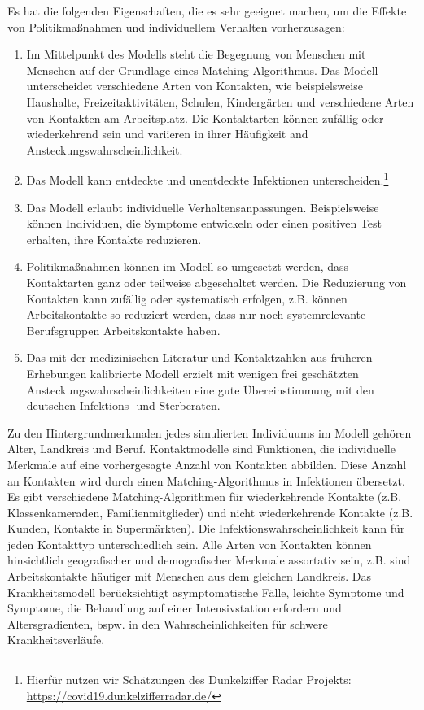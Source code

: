 \documentclass[a4paper,11pt,leqno,fleqn]{article}
\begin{document}
Es hat die folgenden Eigenschaften, die es sehr geeignet machen, um die Effekte von Politikmaßnahmen und individuellem Verhalten vorherzusagen:

\begin{enumerate}
    \item Im  Mittelpunkt des Modells steht die Begegnung von Menschen mit Menschen auf der Grundlage eines Matching-Algorithmus. Das Modell unterscheidet verschiedene Arten von Kontakten, wie beispielsweise Haushalte, Freizeitaktivitäten, Schulen, Kindergärten und verschiedene Arten von Kontakten am Arbeitsplatz. Die Kontaktarten können zufällig oder wiederkehrend sein und variieren in ihrer Häufigkeit and Ansteckungswahrscheinlichkeit.
    \item Das Modell kann entdeckte und unentdeckte Infektionen unterscheiden.\footnote{Hierfür nutzen wir Schätzungen des Dunkelziffer Radar Projekts: \url{https://covid19.dunkelzifferradar.de/}}
    \item Das Modell erlaubt individuelle Verhaltensanpassungen. Beispielsweise können Individuen, die Symptome entwickeln oder einen positiven Test erhalten, ihre Kontakte reduzieren.
    \item Politikmaßnahmen können im Modell so umgesetzt werden, dass Kontaktarten ganz oder teilweise abgeschaltet werden. Die Reduzierung von Kontakten kann zufällig oder systematisch erfolgen, z.B. können Arbeitskontakte so reduziert werden, dass nur noch systemrelevante Berufsgruppen Arbeitskontakte haben.
    \item Das mit der medizinischen Literatur und Kontaktzahlen aus früheren Erhebungen kalibrierte Modell erzielt mit wenigen frei geschätzten Ansteckungswahrscheinlichkeiten eine gute Übereinstimmung mit den deutschen Infektions- und Sterberaten.
\end{enumerate}

Zu den Hintergrundmerkmalen jedes simulierten Individuums im Modell gehören Alter, Landkreis und Beruf.
Kontaktmodelle sind Funktionen, die individuelle Merkmale auf eine vorhergesagte Anzahl von Kontakten abbilden.
Diese Anzahl an Kontakten wird durch einen Matching-Algorithmus in Infektionen übersetzt.
Es gibt verschiedene Matching-Algorithmen für wiederkehrende Kontakte (z.B. Klassenkameraden, Familienmitglieder) und nicht wiederkehrende Kontakte (z.B. Kunden, Kontakte in Supermärkten).
Die Infektionswahrscheinlichkeit kann für jeden Kontakttyp unterschiedlich sein.
Alle Arten von Kontakten können hinsichtlich geografischer und demografischer Merkmale assortativ sein, z.B. sind Arbeitskontakte häufiger mit Menschen aus dem gleichen Landkreis.
Das Krankheitsmodell berücksichtigt asymptomatische Fälle, leichte Symptome und Symptome, die Behandlung auf einer Intensivstation erfordern und Altersgradienten, bspw. in  den  Wahrscheinlichkeiten für schwere Krankheitsverläufe.
\end{document}
